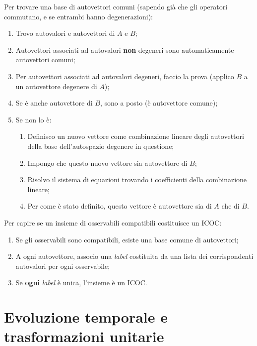 \documentclass{article}
\begin{document}
\noindent Per trovare una base di autovettori comuni (sapendo già che gli operatori commutano, e se entrambi hanno degenerazioni):
\begin{enumerate}
    \item Trovo autovalori e autovettori di $A$ e $B$;
    \item Autovettori associati ad autovalori \textbf{non} degeneri sono automaticamente autovettori comuni;
    \item Per autovettori associati ad autovalori degeneri, faccio la prova (applico $B$ a un autovettore degenere di $A$);
    \item Se è anche autovettore di $B$, sono a posto (è autovettore comune);
    \item Se non lo è:
    \begin{enumerate}
        \item Definisco un nuovo vettore come combinazione lineare degli autovettori della base dell'autospazio degenere in questione;
        \item Impongo che questo nuovo vettore sia autovettore di $B$;
        \item Risolvo il sistema di equazioni trovando i coefficienti della combinazione lineare;
        \item Per come è stato definito, questo vettore è autovettore sia di $A$ che di $B$.
    \end{enumerate}
\end{enumerate}

\noindent Per capire se un insieme di osservabili compatibili costituisce un ICOC:
\begin{enumerate}
    \item Se gli osservabili sono compatibili, esiste una base comune di autovettori;
    \item A ogni autovettore, associo una \textit{label} costituita da una lista dei corrispondenti autovalori per ogni osservabile;
    \item Se \textbf{ogni} \textit{label} è unica, l'insieme è un ICOC.
\end{enumerate}

\section*{Evoluzione temporale e trasformazioni unitarie}
\end{document}
